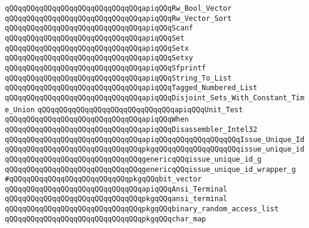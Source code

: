 \verb|qQQqqQQqqQQqqQQqqQQqqQQqqQQqqQQqapiqQQqRw_Bool_Vector|\newline
\verb|qQQqqQQqqQQqqQQqqQQqqQQqqQQqqQQqapiqQQqRw_Vector_Sort|\newline
\verb|qQQqqQQqqQQqqQQqqQQqqQQqqQQqqQQqapiqQQqScanf|\newline
\verb|qQQqqQQqqQQqqQQqqQQqqQQqqQQqqQQqapiqQQqSet|\newline
\verb|qQQqqQQqqQQqqQQqqQQqqQQqqQQqqQQqapiqQQqSetx|\newline
\verb|qQQqqQQqqQQqqQQqqQQqqQQqqQQqqQQqapiqQQqSetxy|\newline
\verb|qQQqqQQqqQQqqQQqqQQqqQQqqQQqqQQqapiqQQqSfprintf|\newline
\verb|qQQqqQQqqQQqqQQqqQQqqQQqqQQqqQQqapiqQQqString_To_List|\newline
\verb|qQQqqQQqqQQqqQQqqQQqqQQqqQQqqQQqapiqQQqTagged_Numbered_List|\newline
\verb|qQQqqQQqqQQqqQQqqQQqqQQqqQQqqQQqapiqQQqDisjoint_Sets_With_Constant_Time_Union|\newline
\verb|qQQqqQQqqQQqqQQqqQQqqQQqqQQqqQQqapiqQQqUnit_Test|\newline
\verb|qQQqqQQqqQQqqQQqqQQqqQQqqQQqqQQqapiqQQqWhen|\newline
\verb|qQQqqQQqqQQqqQQqqQQqqQQqqQQqqQQqapiqQQqDisassembler_Intel32|\newline
\newline
\verb|qQQqqQQqqQQqqQQqqQQqqQQqqQQqqQQqapiqQQqqQQqqQQqqQQqqQQqIssue_Unique_Id|\newline
\verb|qQQqqQQqqQQqqQQqqQQqqQQqqQQqqQQqpkgqQQqqQQqqQQqqQQqqQQqissue_unique_id|\newline
\verb|qQQqqQQqqQQqqQQqqQQqqQQqqQQqqQQqgenericqQQqissue_unique_id_g|\newline
\verb|qQQqqQQqqQQqqQQqqQQqqQQqqQQqqQQqgenericqQQqissue_unique_id_wrapper_g|\newline
\newline
\verb|#qQQqqQQqqQQqqQQqqQQqqQQqqQQqpkgqQQqbit_vector|\newline
\newline
\verb|qQQqqQQqqQQqqQQqqQQqqQQqqQQqqQQqapiqQQqAnsi_Terminal|\newline
\verb|qQQqqQQqqQQqqQQqqQQqqQQqqQQqqQQqpkgqQQqansi_terminal|\newline
\newline
\verb|qQQqqQQqqQQqqQQqqQQqqQQqqQQqqQQqpkgqQQqbinary_random_access_list|\newline
\verb|qQQqqQQqqQQqqQQqqQQqqQQqqQQqqQQqpkgqQQqchar_map|\newline

